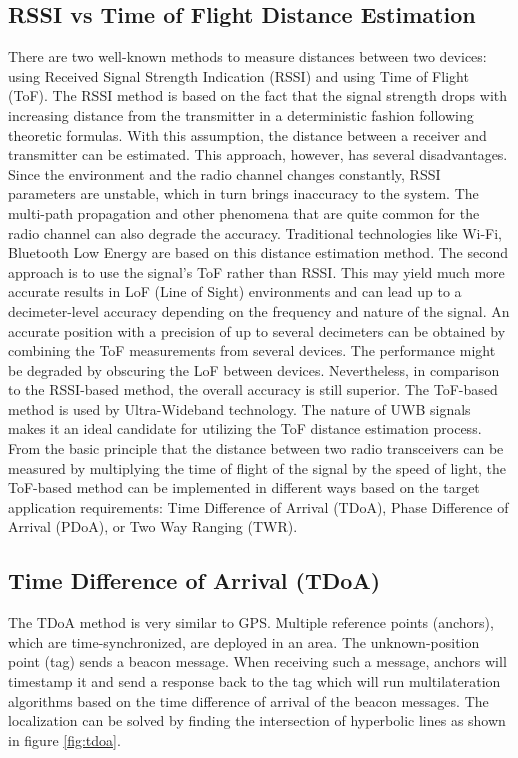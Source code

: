 \documentclass[\main/main.tex]{subfiles}
\begin{document}
\subsection{RSSI vs Time of Flight Distance Estimation}
There are two well-known methods to measure distances between two devices: using Received Signal Strength Indication (RSSI) and using Time of Flight (ToF).
\newline\newline
The RSSI method is based on the fact that the signal strength drops with increasing distance from the transmitter in a deterministic fashion following theoretic formulas. With this assumption, the distance between a receiver and transmitter can be estimated. This approach, however, has several disadvantages. Since the environment and the radio channel changes constantly, RSSI parameters are unstable, which in turn brings inaccuracy to the system. The multi-path propagation and other phenomena that are quite common for the radio channel can also degrade the accuracy. Traditional technologies like Wi-Fi, Bluetooth Low Energy are based on this distance estimation method.
\newline\newline
The second approach is to use the signal’s ToF rather than RSSI. This may yield much more accurate results in LoF (Line of Sight) environments and can lead up to a decimeter-level accuracy depending on the frequency and nature of the signal. An accurate position with a precision of up to several decimeters can be obtained by combining the ToF measurements from several devices. The performance might be degraded by obscuring the LoF between devices. Nevertheless, in comparison to the RSSI-based method, the overall accuracy is still superior. The ToF-based method is used by Ultra-Wideband technology. The nature of UWB signals makes it an ideal candidate for utilizing the ToF distance estimation process. 
\newline\newline
From the basic principle that the distance between two radio transceivers can be measured by multiplying the time of flight of the signal by the speed of light, 
the ToF-based method can be implemented in different ways based on the target application requirements: Time Difference of Arrival (TDoA), Phase Difference of Arrival (PDoA), or Two Way Ranging (TWR).

\subsection{Time Difference of Arrival (TDoA)}
The TDoA method is very similar to GPS. Multiple reference points (anchors), which are time-synchronized, are deployed in an area. The unknown-position point (tag) sends a beacon message. When receiving such a message, anchors will timestamp it and send a response back to the tag which will run multilateration algorithms based on the time difference of arrival of the beacon messages. The localization can be solved by finding the intersection of hyperbolic lines as shown in figure \ref{fig:tdoa}.
\end{document}
